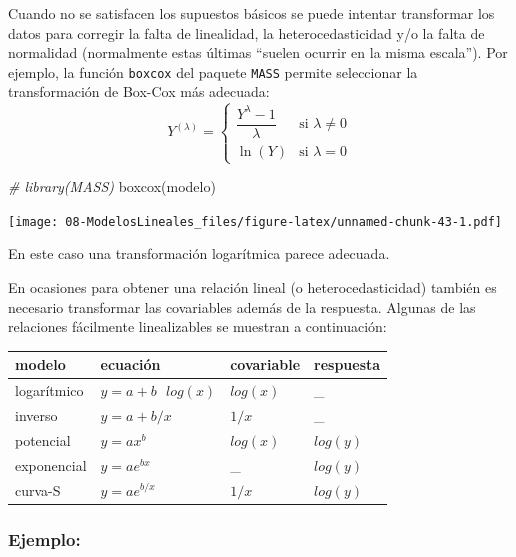 \documentclass[
]{book}
\newenvironment{Shaded}{\begin{snugshade}}{\end{snugshade}}
\newcommand{\CommentTok}[1]{\textcolor[rgb]{0.56,0.35,0.01}{\textit{#1}}}
\newcommand{\FunctionTok}[1]{\textcolor[rgb]{0.00,0.00,0.00}{#1}}
\newcommand{\NormalTok}[1]{#1}
\theoremstyle{break}
\begin{document}
Cuando no se satisfacen los supuestos básicos se puede intentar
transformar los datos para corregir la falta de
linealidad, la heterocedasticidad y/o la falta de normalidad
(normalmente estas últimas ``suelen ocurrir en la misma escala'').
Por ejemplo, la función \texttt{boxcox} del paquete \texttt{MASS} permite seleccionar la transformación de Box-Cox
más adecuada:
\[Y^{(\lambda)} =
\begin{cases}
\dfrac{Y^\lambda - 1}{\lambda} & \text{si } \lambda \neq 0 \\
\ln{(Y)} & \text{si } \lambda = 0
\end{cases}\]

\begin{Shaded}
\begin{Highlighting}[]
\CommentTok{\# library(MASS)}
\FunctionTok{boxcox}\NormalTok{(modelo)}
\end{Highlighting}
\end{Shaded}

\texttt{[image: 08-ModelosLineales\_files/figure-latex/unnamed-chunk-43-1.pdf]}

En este caso una transformación logarítmica parece adecuada.

En ocasiones para obtener una relación lineal (o heterocedasticidad) también es
necesario transformar las covariables además de la respuesta. Algunas de
las relaciones fácilmente linealizables se muestran a continuación:

\begin{longtable}[]{@{}llll@{}}
\toprule
modelo & ecuación & covariable & respuesta \\
\midrule
\endhead
logarítmico & \(y = a + b\text{ }log(x)\) & \(log(x)\) & \_ \\
inverso & \(y = a + b/x\) & \(1/x\) & \_ \\
potencial & \(y = ax^b\) & \(log(x)\) & \(log(y)\) \\
exponencial & \(y = ae^{bx}\) & \_ & \(log(y)\) \\
curva-S & \(y = ae^{b/x}\) & \(1/x\) & \(log(y)\) \\
\bottomrule
\end{longtable}

\hypertarget{ejemplo-1}{%
\subsubsection{Ejemplo:}\label{ejemplo-1}}
\end{document}
